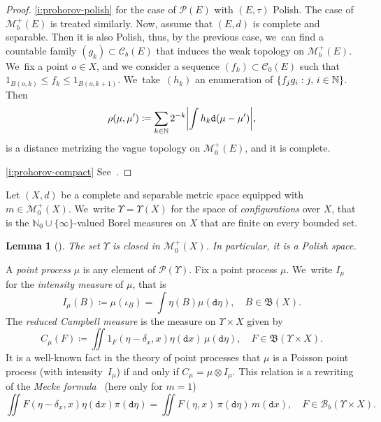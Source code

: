 \documentclass[JEP,XML,SOM,Unicode,published]{cedram}
\newtheorem{lemma}[theorem]{Lemma}
\theoremstyle{definition}
\theoremstyle{remark}
\DeclarePairedDelimiter{\set}{\lbrace}{\rbrace}
\DeclarePairedDelimiter{\abs}{\lvert}{\rvert}
\begin{document}
\skpt
\begin{proof}
\cref{i:prohorov-polish} \cite[Th.\,6.2, 6.5, \& 6.6]{Parthasarathy} for the case of $\mathscr{P}(E)$ with $(E,\tau)$ Polish.
The case of $\mathscr{M}_{b}^{+}(E)$ is treated similarly.
Now, assume that $(E,d)$ is complete and separable.
Then it is also Polish, thus, by the previous case, we~can find a countable family $(g_{k}) \subset \mathscr{C}_{b}(E)$ that induces the weak topology on $\mathscr{M}^{+}_{b}(E)$. We~fix a point $o \in X$, and we consider a sequence $(f_{k}) \subset \mathscr{C}_{0}(E)$ such that $1_{B(o,k)} \leq f_{k} \leq 1_{B(o,k+1)}$. We~take~$(h_{k})$ an enumeration of $\set{ f_{j} g_{i} : j,\, i \in \mathbb{N} }$.
Then
\begin{equation*}
\rho(\mu, \mu') \coloneq \sum_{k \in \mathbb{N}} 2^{-k} \abs*{ \int h_{k} \mathtt{d} (\mu - \mu') },
\end{equation*}
is a distance metrizing the vague topology on $\mathscr{M}_{0}^{+}(E)$, and it is complete.

\cref{i:prohorov-compact} See~\cite[Th.\,8.6.2]{Bogachev}.
\end{proof}

Let $(X, d)$ be a complete and separable metric space equipped with $m \in \mathscr{M}_{0}^{+}(X)$. We~write $\varUpsilon = \varUpsilon(X)$ for the space of \emph{configurations} over $X$, that is the $\mathbb{N}_{0} \cup \{\infty\}$-valued Borel measures on $X$ that are finite on every bounded set.

\begin{lemma}[{\eg \cite[Lem.\,2.1]{GHP}}]\label{t:config-locally-compact}
The set $\varUpsilon$ is closed in $\mathscr{M}_{0}^{+}(X)$. In particular, it is a Polish space.
\end{lemma}

A \emph{point process} $\mu$ is any element of $\mathscr{P}(\varUpsilon)$.
Fix a point process $\mu$. We~write $I_{\mu}$ for the \emph{intensity measure} of $\mu$, that is
\begin{equation*}
I_{\mu}(B) \coloneq \mu(\iota_{B}) = \int \eta(B) \mu(\mathtt{d} \eta), \quad B \in \mathfrak{B}(X).
\end{equation*}
The \emph{reduced Campbell measure} is the measure on $\varUpsilon \times X$ given by
\begin{equation*}
C_{\mu}(F) \coloneq \iint 1_{F}(\eta - \delta_{x}, x) \eta(\mathtt{d} x)\, \mu(\mathtt{d} \eta), \quad F \in \mathfrak{B}(\varUpsilon \times X).
\end{equation*}
It is a well-known fact in the theory of point processes that $\mu$ is a Poisson point process (with intensity~$I_{\mu}$) if and only if $C_{\mu} = \mu \otimes I_{\mu}$.
This relation is a rewriting of the \emph{Mecke formula}~\cite[Th.\,4.5]{LastPenrose} (here only for $m =1$)
\begin{equation}\label{eq:Mecke2}
\iint F(\eta - \delta_{x}, x) \eta(\mathtt{d} x) \pi(\mathtt{d}\eta) = \iint F(\eta,x)\, \pi(\mathtt{d} \eta)\, m(\mathtt{d} x), \quad F \in \mathscr{B}_{b}(\varUpsilon \times X).
\end{equation}
\end{document}
